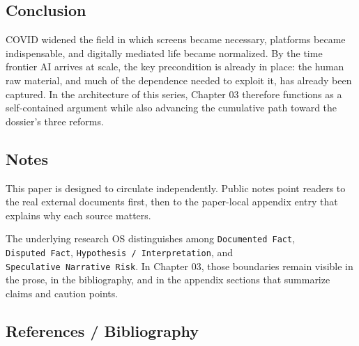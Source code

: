 \documentclass[
  american,
  11pt,
  letterpaper,
]{article}
\begin{document}
\subsection{Conclusion}\label{conclusion}

COVID widened the field in which screens became necessary, platforms
became indispensable, and digitally mediated life became normalized. By
the time frontier AI arrives at scale, the key precondition is already
in place: the human raw material, and much of the dependence needed to
exploit it, has already been captured. In the architecture of this
series, Chapter 03 therefore functions as a self-contained argument
while also advancing the cumulative path toward the dossier's three
reforms.

\subsection{Notes}\label{notes}

This paper is designed to circulate independently. Public notes point
readers to the real external documents first, then to the paper-local
appendix entry that explains why each source matters.

The underlying research OS distinguishes among
\texttt{Documented\ Fact}, \texttt{Disputed\ Fact},
\texttt{Hypothesis\ /\ Interpretation}, and
\texttt{Speculative\ Narrative\ Risk}. In Chapter 03, those boundaries
remain visible in the prose, in the bibliography, and in the appendix
sections that summarize claims and caution points.

\subsection{References / Bibliography}\label{references-bibliography}
\end{document}
